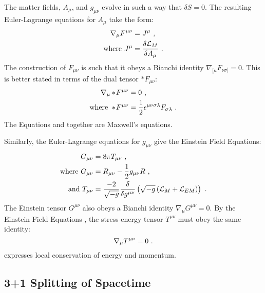   The matter fields, $A_\mu$, and $g_{\mu\nu}$ evolve in such a way that $\delta S = 0$.  The resulting Euler-Lagrange equations for $A_\mu$ take the form:
  \begin{align}
  	\nabla_\mu F^{\mu\nu} &= J^\mu \eqlabel{maxwell1} \ , \\
	\text{where } J^\mu &= \frac{\delta \LL_M}{\delta A_\mu}\ .
   \end{align}
   The construction of $F_{\mu\nu}$ is such that it obeys a Bianchi identity $\nabla_{[\mu}F_{\nu\sigma]} = 0$.  This is better stated in terms of the dual tensor $*F_{\mu\nu}$:
     \begin{align}
  	\nabla_\mu *\! F^{\mu\nu} &= 0 \eqlabel{maxwell2} \ , \\
	\text{where } *\! F^{\mu\nu} &= \frac{1}{2}\epsilon^{\mu\nu\sigma\lambda}F_{\sigma\lambda} \ .
   \end{align}
   The Equations  and  together are Maxwell's equations.
   
   Similarly, the Euler-Lagrange equations for $g_{\mu\nu}$ give the Einstein Field Equations:
  \begin{align}
	G_{\mu\nu} &= 8\pi T_{\mu\nu} \eqlabel{einstein} \ , \\
	\text{where } G_{\mu\nu} &= R_{\mu\nu} - \frac{1}{2}g_{\mu\nu} R \ , \\
	\text{and } T_{\mu\nu} &= \frac{-2}{\sqrt{-g}} \frac{\delta}{\delta g^{\mu\nu}}\left(\sqrt{-g}\left( \LL_M + \LL_{EM} \right)\right) \ . \eqlabel{defTmunu}
   \end{align} 
   The Einstein tensor $G^{\mu\nu}$ also obeys a Bianchi identity $\nabla_\mu G^{\mu\nu}=0$. By the Einstein Field Equations , the stress-energy tensor $T^{\mu\nu}$ must obey the same identity:
   \begin{equation}
   	\nabla_\mu T^{\mu\nu} = 0 \eqlabel{consSE}\ .
   \end{equation}  
    expresses local conservation of energy and momentum.
   
   \subsection{3+1 Splitting of Spacetime}
   
